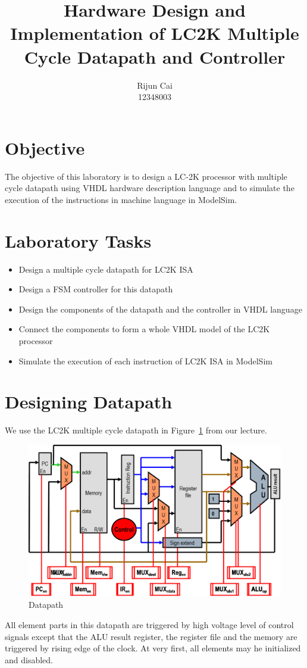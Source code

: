 \documentclass[a4paper]{article}
\title{Hardware Design and Implementation of LC2K Multiple Cycle Datapath and Controller}
\author{Rijun Cai\\12348003}
\begin{document}
\maketitle

\section{Objective}
The objective of this laboratory is to design a LC-2K processor with multiple cycle datapath using VHDL hardware description language and to simulate the execution of the instructions in machine language in ModelSim.

\section{Laboratory Tasks}
\begin{itemize}
    \item Design a multiple cycle datapath for LC2K ISA
    \item Design a FSM controller for this datapath
    \item Design the components of the datapath and the controller in VHDL language 
    \item Connect the components to form a whole VHDL model of the LC2K processor
    \item Simulate the execution of each instruction of LC2K ISA in ModelSim
\end{itemize}

\section{Designing Datapath}
We use the LC2K multiple cycle datapath in Figure~\ref{fig:datapath} from our lecture.
\begin{figure}[ht!]
    \center
    \includegraphics[scale=0.7]{datapath}
    \caption{Datapath}\label{fig:datapath}
\end{figure}
All element parts in this datapath are triggered by high voltage level of control signals except that the ALU result register, the register file and the memory are triggered by rising edge of the clock. At very first, all elements may he initialized and disabled.
\end{document}
